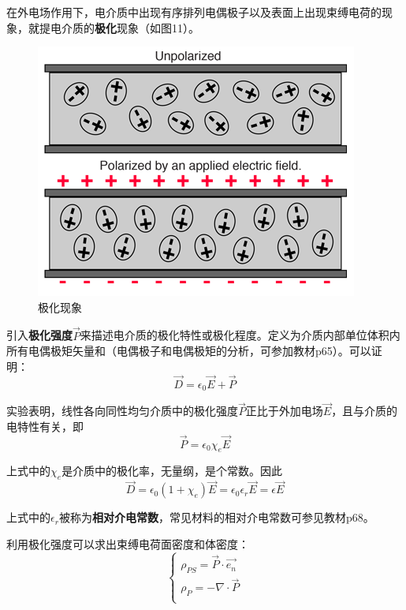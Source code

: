 \documentclass[UTF8,a4paper,11pt]{article}
\begin{document}
在外电场作用下，电介质中出现有序排列电偶极子以及表面上出现束缚电荷的现象，就提电介质的\textbf{极化}现象（如图11）。
\begin{figure}[htbp]
\centering
\includegraphics[scale=2]{p11.png}
\caption{极化现象}
\end{figure}

引入\textbf{极化强度}$\overrightarrow{P}$来描述电介质的极化特性或极化程度。定义为介质内部单位体积内所有电偶极矩矢量和（电偶极子和电偶极矩的分析，可参加教材p65）。可以证明：
\begin{equation}
\overrightarrow{D}=\epsilon_0\overrightarrow{E}+\overrightarrow{P}
\end{equation}

实验表明，线性各向同性均匀介质中的极化强度$\overrightarrow{P}$正比于外加电场$\overrightarrow{E}$，且与介质的电特性有关，即
\begin{equation}
\overrightarrow{P}=\epsilon_0\chi_e\overrightarrow{E}
\end{equation}

上式中的$\chi_e$是介质中的极化率，无量纲，是个常数。因此
\begin{equation}
\overrightarrow{D}=\epsilon_0(1+\chi_e)\overrightarrow{E}=\epsilon_0\epsilon_r\overrightarrow{E}=\epsilon\overrightarrow{E}
\end{equation}

上式中的$\epsilon_r$被称为\textbf{相对介电常数}，常见材料的相对介电常数可参见教材p68。

利用极化强度可以求出束缚电荷面密度和体密度：
\begin{equation}
\begin{cases}
\rho_{PS}=\overrightarrow{P}\cdot\overrightarrow{e_n}\\
\rho_P=-\nabla\cdot\overrightarrow{P}\\
\end{cases}
\end{equation}
\end{document}
